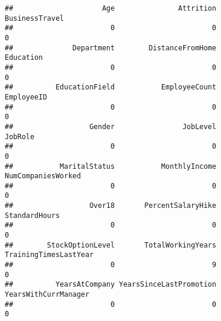 \documentclass[
]{article}
\newenvironment{Shaded}{\begin{snugshade}}{\end{snugshade}}
\newcommand{\AttributeTok}[1]{\textcolor[rgb]{0.77,0.63,0.00}{#1}}
\newcommand{\CommentTok}[1]{\textcolor[rgb]{0.56,0.35,0.01}{\textit{#1}}}
\newcommand{\ConstantTok}[1]{\textcolor[rgb]{0.00,0.00,0.00}{#1}}
\newcommand{\FunctionTok}[1]{\textcolor[rgb]{0.00,0.00,0.00}{#1}}
\newcommand{\NormalTok}[1]{#1}
\newcommand{\OtherTok}[1]{\textcolor[rgb]{0.56,0.35,0.01}{#1}}
\newcommand{\SpecialCharTok}[1]{\textcolor[rgb]{0.00,0.00,0.00}{#1}}
\begin{document}
\begin{verbatim}
##                     Age               Attrition          BusinessTravel 
##                       0                       0                       0 
##              Department        DistanceFromHome               Education 
##                       0                       0                       0 
##          EducationField           EmployeeCount              EmployeeID 
##                       0                       0                       0 
##                  Gender                JobLevel                 JobRole 
##                       0                       0                       0 
##           MaritalStatus           MonthlyIncome      NumCompaniesWorked 
##                       0                       0                       0 
##                  Over18       PercentSalaryHike           StandardHours 
##                       0                       0                       0 
##        StockOptionLevel       TotalWorkingYears   TrainingTimesLastYear 
##                       0                       9                       0 
##          YearsAtCompany YearsSinceLastPromotion    YearsWithCurrManager 
##                       0                       0                       0
\end{verbatim}

\begin{Shaded}
\end{Shaded}
\end{document}
